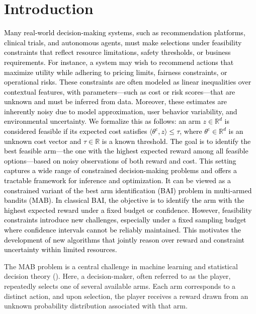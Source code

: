 \documentclass[accepted]{uai2025} %
\newcommand{\red}[1]{\textcolor{black}{#1}}
\theoremstyle{plain}
\theoremstyle{definition}
\theoremstyle{remark}
\newcommand{\thetac}{\theta^{\mathrm{c}}}
\begin{document}
\vspace{-.1in}
\section{Introduction}\vspace{-.1in}
\label{Introduction}
\red{Many real-world decision-making systems, such as recommendation platforms, clinical trials, and autonomous agents, must make selections under feasibility constraints that reflect resource limitations, safety thresholds, or business requirements. For instance, a system may wish to recommend actions that maximize utility while adhering to pricing limits, fairness constraints, or operational risks. These constraints are often modeled as linear inequalities over contextual features, with parameters—such as cost or risk scores—that are unknown and must be inferred from data. Moreover, these estimates are inherently noisy due to model approximation, user behavior variability, and environmental uncertainty. We formalize this as follows: an arm \( z \in \mathbb{R}^d \) is considered feasible if its expected cost satisfies \( \langle \thetac, z \rangle \leq \tau \), where \( \thetac \in \mathbb{R}^d \) is an unknown cost vector and \( \tau \in \mathbb{R} \) is a known threshold. The goal is to identify the best feasible arm—the one with the highest expected reward among all feasible options—based on noisy observations of both reward and cost. This setting captures a wide range of constrained decision-making problems and offers a tractable framework for inference and optimization. It can be viewed as a constrained variant of the best arm identification (BAI) problem in multi-armed bandits (MAB). In classical BAI, the objective is to identify the arm with the highest expected reward under a fixed budget or confidence. However, feasibility constraints introduce new challenges, especially under a fixed sampling budget where confidence intervals cannot be reliably maintained. This motivates the development of new algorithms that jointly reason over reward and constraint uncertainty within limited resources.
}

The  MAB  problem is a central challenge in machine learning and statistical decision theory (\cite{lattimore2020bandit}). Here, a decision-maker, often referred to as the player, repeatedly selects one of several available arms. Each arm corresponds to a distinct action, and upon selection, the player receives a reward drawn from an unknown probability distribution associated with that arm.
\end{document}

